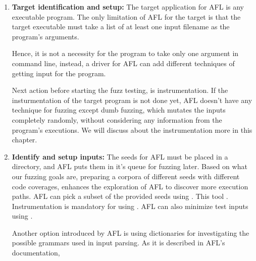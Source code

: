 \begin{enumerate}
    \item \textbf{Target identification and setup:}
    The target application for AFL is any executable program. The only limitation of AFL for the target is that the target executable must take a list of at least one input filename as the program's arguments. 
    


    Hence, it is not a necessity for the program to take only one argument in command line, instead, a driver for AFL can add different techniques of getting input for the program.

    Next action before starting the fuzz testing, is instrumentation. If the insturmentation of the target program is not done yet, AFL doesn't have any technique for fuzzing except dumb fuzzing, which mutates the inputs completely randomly, without considering any information from the program's executions. We will discuss about the instrumentation more in this chapter.
    
    \item \textbf{Identify and setup inputs:}
    The seeds for AFL must be placed in a directory, and AFL puts them in it's queue for fuzzing later. Based on what our fuzzing goals are, preparing a corpora of different seeds with different code coverages, enhances the exploration of AFL to discover more execution paths. AFL can pick a subset of the provided seeds using . This tool . Instrumentation is mandatory for using . AFL can also minimize test inputs using .  \cite{afl_git}

    Another option introduced by AFL is using dictionaries for investigating the possible grammars used in input parsing. As it is described in AFL's documentation, 
\end{enumerate}
